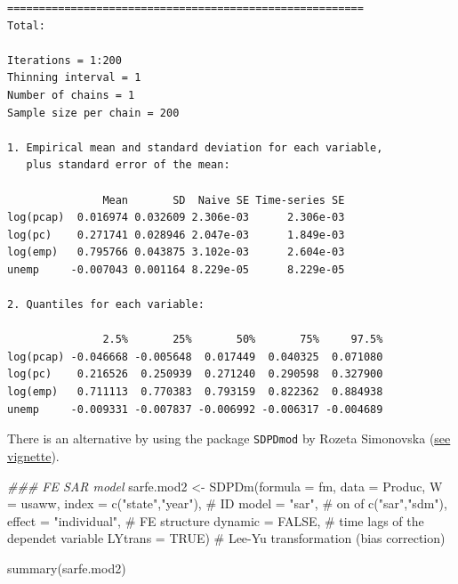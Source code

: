 \documentclass[
  letterpaper,
  DIV=11,
  numbers=noendperiod]{scrreprt}
\newenvironment{Shaded}{\begin{snugshade}}{\end{snugshade}}
\newcommand{\AttributeTok}[1]{\textcolor[rgb]{0.40,0.45,0.13}{#1}}
\newcommand{\CommentTok}[1]{\textcolor[rgb]{0.37,0.37,0.37}{#1}}
\newcommand{\ConstantTok}[1]{\textcolor[rgb]{0.56,0.35,0.01}{#1}}
\newcommand{\DocumentationTok}[1]{\textcolor[rgb]{0.37,0.37,0.37}{\textit{#1}}}
\newcommand{\FunctionTok}[1]{\textcolor[rgb]{0.28,0.35,0.67}{#1}}
\newcommand{\NormalTok}[1]{\textcolor[rgb]{0.00,0.23,0.31}{#1}}
\newcommand{\OtherTok}[1]{\textcolor[rgb]{0.00,0.23,0.31}{#1}}
\newcommand{\StringTok}[1]{\textcolor[rgb]{0.13,0.47,0.30}{#1}}
\begin{document}
\begin{verbatim}
========================================================
Total:

Iterations = 1:200
Thinning interval = 1 
Number of chains = 1 
Sample size per chain = 200 

1. Empirical mean and standard deviation for each variable,
   plus standard error of the mean:

               Mean       SD  Naive SE Time-series SE
log(pcap)  0.016974 0.032609 2.306e-03      2.306e-03
log(pc)    0.271741 0.028946 2.047e-03      1.849e-03
log(emp)   0.795766 0.043875 3.102e-03      2.604e-03
unemp     -0.007043 0.001164 8.229e-05      8.229e-05

2. Quantiles for each variable:

               2.5%       25%       50%       75%     97.5%
log(pcap) -0.046668 -0.005648  0.017449  0.040325  0.071080
log(pc)    0.216526  0.250939  0.271240  0.290598  0.327900
log(emp)   0.711113  0.770383  0.793159  0.822362  0.884938
unemp     -0.009331 -0.007837 -0.006992 -0.006317 -0.004689
\end{verbatim}

There is an alternative by using the package \texttt{SDPDmod} by Rozeta
Simonovska
(\href{https://cran.r-project.org/web/packages/SDPDmod/vignettes/spatial_model.html}{see
vignette}).

\begin{Shaded}
\begin{Highlighting}[]
\DocumentationTok{\#\#\# FE SAR model}
\NormalTok{sarfe.mod2 }\OtherTok{\textless{}{-}} \FunctionTok{SDPDm}\NormalTok{(}\AttributeTok{formula =}\NormalTok{ fm, }
                    \AttributeTok{data =}\NormalTok{ Produc, }
                    \AttributeTok{W =}\NormalTok{ usaww,                 }
                    \AttributeTok{index =} \FunctionTok{c}\NormalTok{(}\StringTok{"state"}\NormalTok{,}\StringTok{"year"}\NormalTok{), }\CommentTok{\# ID}
                    \AttributeTok{model =} \StringTok{"sar"}\NormalTok{,             }\CommentTok{\# on of c("sar","sdm"),}
                    \AttributeTok{effect =} \StringTok{"individual"}\NormalTok{,     }\CommentTok{\# FE structure}
                    \AttributeTok{dynamic =} \ConstantTok{FALSE}\NormalTok{,           }\CommentTok{\# time lags of the dependet variable}
                    \AttributeTok{LYtrans =} \ConstantTok{TRUE}\NormalTok{)            }\CommentTok{\# Lee{-}Yu transformation (bias correction)}

\FunctionTok{summary}\NormalTok{(sarfe.mod2)}
\end{Highlighting}
\end{Shaded}
\end{document}
